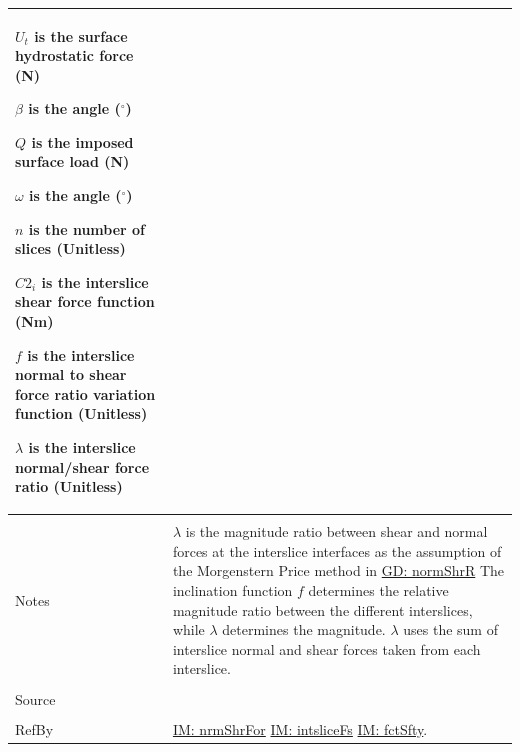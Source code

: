 \documentclass[12pt]{article}
\begin{document}
\begin{minipage}{\textwidth}
\begin{tabular}{p{} p{}}
\begin{symbDescription}
                                                                                           \item{${U_{t}}$ is the surface hydrostatic force (N)}
                                                                                           \item{$β$ is the angle (${}^{\circ}$)}
                                                                                           \item{$Q$ is the imposed surface load (N)}
                                                                                           \item{$ω$ is the angle (${}^{\circ}$)}
                                                                                           \item{$n$ is the number of slices (Unitless)}
                                                                                           \item{${C2_{i}}$ is the interslice shear force function (Nm)}
                                                                                           \item{$f$ is the interslice normal to shear force ratio variation function (Unitless)}
                                                                                           \item{$λ$ is the interslice normal/shear force ratio (Unitless)}
                                                                                           \end{symbDescription}
                                                                                           \\ \midrule \\
                                                                                           Notes & $λ$ is the magnitude ratio between shear and normal forces at the interslice interfaces as the assumption of the Morgenstern Price method in \hyperref[GD:normShrR]{GD: normShrR} The inclination function $f$ determines the relative magnitude ratio between the different interslices, while $λ$ determines the magnitude. $λ$ uses the sum of interslice normal and shear forces taken from each interslice.
                                                                                                   \\ \midrule \\
                                                                                                   Source & \cite{chen2005}
                                                                                                            \\ \midrule \\
                                                                                                            RefBy & \hyperref[IM:nrmShrFor]{IM: nrmShrFor} \hyperref[IM:intsliceFs]{IM: intsliceFs} \hyperref[IM:fctSfty]{IM: fctSfty}.
\\ \bottomrule \end{tabular}
\end{minipage}
\end{document}
